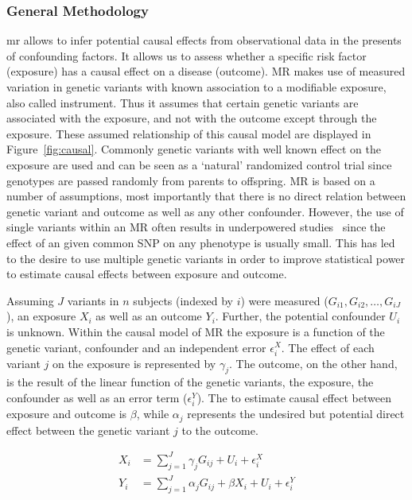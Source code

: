 \subsubsection{General Methodology}
\label{ssub:General_Methedology}

\acrfull{mr} allows to infer potential causal effects from observational data in the presents of confounding factors. 
It allows us to assess whether a specific risk factor (exposure) has a causal effect on a disease (outcome).
MR makes use of measured variation in genetic variants with known association to a modifiable exposure, also called instrument.
Thus it assumes that certain genetic variants are associated with the exposure, and not with the outcome except through the exposure.
These assumed relationship of this causal model are displayed in Figure~\ref{fig:causal}.
Commonly genetic variants with well known effect on the exposure are used and can be seen as a `natural' randomized control trial since genotypes are passed randomly from parents to offspring.
MR is based on a number of assumptions, most importantly that there is no direct relation between genetic variant and outcome as well as any other confounder.
However, the use of single variants within an MR often results in underpowered studies~\cite{Bowden2015} since the effect of an given common SNP on any phenotype is usually small.
This has led to the desire to use multiple genetic variants in order to improve statistical power to estimate causal effects between exposure and outcome.

Assuming $J$ variants in $n$ subjects (indexed by $i$) were measured ($G_{i1}, G_{i2}, \ldots , G_{iJ}$),
an exposure $X_i$ as well as an outcome $Y_i$.
Further, the potential confounder $U_i$ is unknown. 
Within the causal model of MR the exposure is a function of the genetic variant, confounder and an independent error $\epsilon_i^X$. 
The effect of each variant $j$ on the exposure is represented by $\gamma_j$.
The outcome, on the other hand, is the result of the linear function of the genetic variants, the exposure, the confounder as well as an error term ($\epsilon_i^Y$).
The to estimate causal effect between exposure and outcome is $\beta$, while $\alpha_j$ represents the undesired but potential direct effect between the genetic variant $j$ to the outcome.

\begin{equation} \label{eq:rm_basic}
  \begin{split}
    X_i &= \sum^J_{j=1} \gamma_jG_{ij} + U_i + \epsilon_i^X \\
    Y_i &= \sum^J_{j=1} \alpha_jG_{ij} + \beta X_i + U_i + \epsilon_i^Y \\
  \end{split}
\end{equation}

